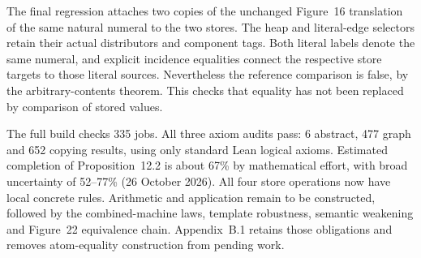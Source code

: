 The final regression attaches two copies of the unchanged Figure~16
translation of the same natural numeral to the two stores. The heap and
literal-edge selectors retain their actual distributors and component
tags. Both literal labels denote the same numeral, and explicit incidence
equalities connect the respective store targets to those literal sources.
Nevertheless the reference comparison is false, by the arbitrary-contents
theorem. This checks that equality has not been replaced by comparison of
stored values.








The full build checks 335 jobs. All three axiom audits pass: 6 abstract,
477 graph and 652 copying results, using only standard Lean logical axioms.
Estimated completion of Proposition~12.2 is about 67\% by mathematical effort,
with broad uncertainty of 52--77\% (26 October 2026). All four store operations
now have local concrete rules. Arithmetic and application remain to be
constructed, followed by the combined-machine laws, template robustness,
semantic weakening and Figure~22 equivalence chain. Appendix~B.1 retains
those obligations and removes atom-equality construction from pending work.

